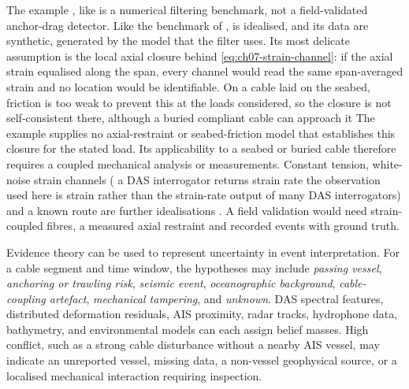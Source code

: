 \documentclass[graybox,envcountchap]{style/SNmono}
\providecommand{\DIFadd}[1]{{\protect\color{blue} #1}} %
\providecommand{\DIFdel}[1]{{\protect\color{red} #1}} %
\providecommand{\DIFaddbegin}{} %
\providecommand{\DIFaddend}{} %
\providecommand{\DIFdelbegin}{} %
\providecommand{\DIFdelend}{} %
\begin{document}
The example \DIFdelbegin \DIFdel{, like }\DIFdelend \DIFaddbegin \DIFadd{is a numerical filtering benchmark, not a field-validated anchor-drag detector. Like }\DIFaddend the benchmark of \cite{oliva_quadratic_ejc_2026}, is idealised, and its data are synthetic, generated by the model that the filter uses. Its most delicate assumption is the local axial closure behind \eqref{eq:ch07-strain-channel}: if the axial strain equalised along the span, every channel would read the same span-averaged strain and no location would be identifiable. \DIFdelbegin \DIFdel{On a cable laid on the seabed, friction is too weak to prevent this at the loads considered, so the closure is not self-consistent there, although a buried compliant cable can approach it}\DIFdelend \DIFaddbegin \DIFadd{The example supplies no axial-restraint or seabed-friction model that establishes this closure for the stated load. Its applicability to a seabed or buried cable therefore requires a coupled mechanical analysis or measurements}\DIFaddend . Constant tension, white-noise strain channels (\DIFdelbegin \DIFdel{a DAS interrogator returns strain rate}\DIFdelend \DIFaddbegin \DIFadd{the observation used here is strain rather than the strain-rate output of many DAS interrogators}\DIFaddend ) and a known route are further idealisations \cite{oliva_quadratic_ejc_2026}. A field validation would need strain-coupled fibres, a measured axial restraint and recorded events with ground truth.


Evidence theory can be used to represent uncertainty in event interpretation. For a cable segment and time window, the hypotheses may include \emph{passing vessel}, \emph{anchoring or trawling risk}, \emph{seismic event}, \emph{oceanographic background}, \emph{cable-coupling artefact}, \emph{mechanical tampering}, and \emph{unknown}. DAS spectral features, distributed deformation residuals, AIS proximity, radar tracks, hydrophone data, bathymetry, and environmental models can each assign belief masses. High conflict, such as a strong cable disturbance without a nearby AIS vessel, may indicate an unreported vessel, missing data, a non-vessel geophysical source, or a localised mechanical interaction requiring inspection.
\end{document}
